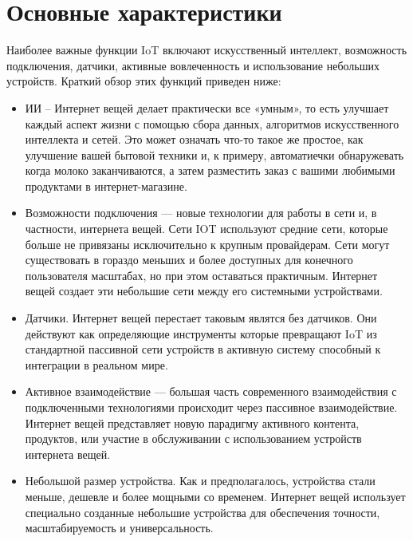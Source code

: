 \section{Основные характеристики}

Наиболее важные функции IoT включают искусственный интеллект, возможность подключения, датчики, активные
вовлеченность и использование небольших устройств. Краткий обзор этих функций приведен ниже:
\begin{itemize}
    \item ИИ – Интернет вещей делает практически все «умным», то есть улучшает каждый аспект
    жизни с помощью сбора данных, алгоритмов искусственного интеллекта и сетей.
    Это может означать что-то такое же простое, как улучшение вашей бытовой техники и, к примеру, автоматиечки обнаружевать
    когда молоко заканчиваются, а затем разместить заказ с вашими любимыми продуктами в интернет-магазине.
    \item Возможности подключения — новые технологии для работы в сети и, в частности, интернета вещей.
    Сети IOT используют средние сети, которые больше не привязаны исключительно к крупным провайдерам. Сети
    могут существовать в гораздо меньших и более доступных для конечного пользователя масштабах, но при этом оставаться практичным. Интернет вещей создает
    эти небольшие сети между его системными устройствами.\cite{IoTAzure}
    \item Датчики. Интернет вещей перестает таковым являтся без датчиков. Они действуют как определяющие инструменты
    которые превращают IoT из стандартной пассивной сети устройств в активную систему
    способный к интеграции в реальном мире.
    \item Активное взаимодействие — большая часть современного взаимодействия с подключенными технологиями происходит
    через пассивное взаимодействие. Интернет вещей представляет новую парадигму активного контента, продуктов,
    или участие в обслуживании с использованием устройств интернета вещей.
    \item Небольшой размер устройства. Как и предполагалось, устройства стали меньше, дешевле и более мощными
     со временем. Интернет вещей использует специально созданные небольшие устройства для обеспечения точности,
    масштабируемость и универсальность.
\end{itemize}